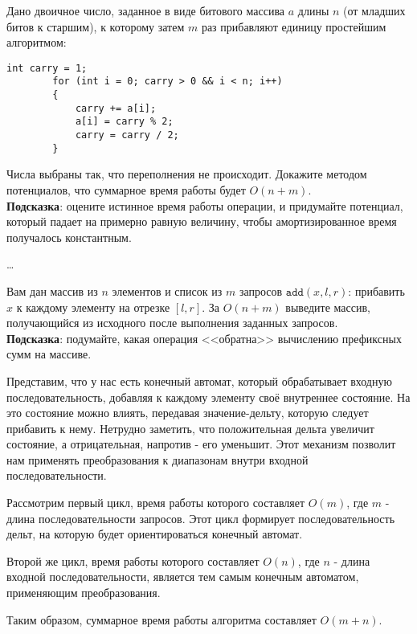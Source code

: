 
\begin{problem}
    Дано двоичное число, заданное в виде битового массива $a$ длины $n$ (от младших битов к старшим), к которому
    затем $m$ раз прибавляют единицу простейшим алгоритмом:

    {
        \normalfont\begin{lstlisting}[title={Листинг алгоритма}]
        int carry = 1;
        for (int i = 0; carry > 0 && i < n; i++)
        {
            carry += a[i];
            a[i] = carry % 2;
            carry = carry / 2;
        }
        \end{lstlisting}
    }

    Числа выбраны так, что переполнения не происходит. Докажите методом потенциалов, что суммарное время
    работы будет $O(n + m)$.\\
    {\footnotesize \textbf{Подсказка}: оцените истинное время работы операции, и придумайте потенциал, который падает на примерно равную величину, чтобы амортизированное время получалось константным.}
\end{problem}

\begin{solution}
    \dots
\end{solution}


\begin{problem}
    Вам дан массив из $n$ элементов и
    список из $m$ запросов $\mathtt{add}(x, l, r)$: прибавить $x$ к каждому
    элементу на отрезке $[l, r]$. За $O(n + m)$ выведите массив,
    получающийся из исходного после выполнения заданных запросов.\\
    {\footnotesize \textbf{Подсказка}: подумайте, какая операция <<обратна>> вычислению префиксных сумм на массиве.}
\end{problem}

\begin{solution}
    \leavevmode\vspace{1pt}
    

    Представим, что у нас есть конечный автомат, который обрабатывает входную последовательность, добавляя к каждому
    элементу своё
    внутреннее состояние. На это состояние можно влиять, передавая значение-дельту, которую следует прибавить к нему.
    Нетрудно заметить, что положительная дельта увеличит состояние, а отрицательная, напротив - его
    уменьшит. Этот механизм позволит нам применять преобразования к диапазонам внутри входной последовательности.

    Рассмотрим первый цикл, время работы которого составляет \( O(m) \), где \( m \) - длина последовательности запросов.
    Этот цикл формирует последовательность дельт, на которую будет ориентироваться конечный автомат.

    Второй же цикл, время работы которого составляет \( O(n) \), где \( n \) - длина входной последовательности,
    является тем самым конечным автоматом, применяющим преобразования.

    Таким образом, суммарное время работы алгоритма составляет \( O(m + n) \).
\end{solution}



